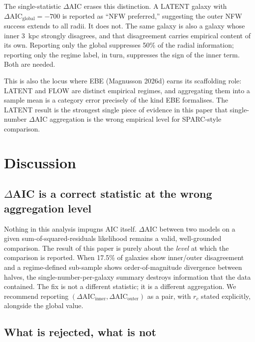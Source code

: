 \documentclass[11pt,a4paper]{article}
\begin{document}
The single-statistic $\Delta\text{AIC}$ erases this distinction.  A
LATENT galaxy with $\Delta\text{AIC}_{\text{global}}=-700$ is reported
as ``NFW preferred,'' suggesting the outer NFW success extends to all
radii.  It does not.  The same galaxy is also a galaxy whose inner
3~kpc strongly disagrees, and that disagreement carries empirical content
of its own.  Reporting only the global suppresses 50\% of the radial
information; reporting only the regime label, in turn, suppresses the
sign of the inner term.  Both are needed.

This is also the locus where EBE (Magnusson 2026d) earns its scaffolding
role: LATENT and FLOW are distinct empirical regimes, and aggregating
them into a sample mean is a category error precisely of the kind EBE
formalises.  The LATENT result is the strongest single piece of evidence
in this paper that single-number $\Delta\text{AIC}$ aggregation is the
wrong empirical level for SPARC-style comparison.

\section{Discussion}
\label{sec:discussion}

\subsection{$\Delta$AIC is a correct statistic at the wrong aggregation level}

Nothing in this analysis impugns AIC itself.  $\Delta\text{AIC}$ between
two models on a given sum-of-squared-residuals likelihood remains a
valid, well-grounded comparison.  The result of this paper is purely
about the {\em level} at which the comparison is reported.  When 17.5\%
of galaxies show inner/outer disagreement and a regime-defined
sub-sample shows order-of-magnitude divergence between halves, the
single-number-per-galaxy summary destroys information that the data
contained.  The fix is not a different statistic; it is a different
aggregation.  We recommend reporting
$(\Delta\text{AIC}_{\text{inner}}, \Delta\text{AIC}_{\text{outer}})$
as a pair, with $r_c$ stated explicitly, alongside the global value.

\subsection{What is rejected, what is not}
\end{document}
